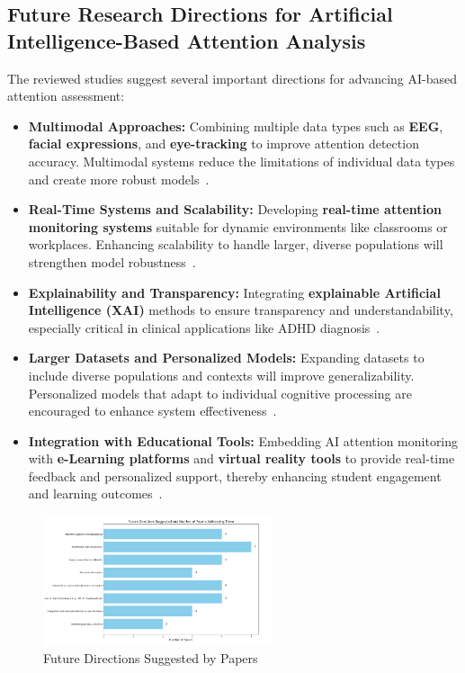 \documentclass[twocolumn,12pt]{article}
\begin{document}
{\subsection{Future Research Directions for Artificial Intelligence-Based Attention Analysis}

The reviewed studies suggest several important directions for advancing AI-based attention assessment:

\begin{itemize}
    \item \textbf{Multimodal Approaches:} Combining multiple data types such as \textbf{EEG}, \textbf{facial expressions}, and \textbf{eye-tracking} to improve attention detection accuracy. Multimodal systems reduce the limitations of individual data types and create more robust models~\citep{ref1,ref7,ref8}.
    
    \item \textbf{Real-Time Systems and Scalability:} Developing \textbf{real-time attention monitoring systems} suitable for dynamic environments like classrooms or workplaces. Enhancing scalability to handle larger, diverse populations will strengthen model robustness~\citep{ref6,ref16}.
    
    \item \textbf{Explainability and Transparency:} Integrating \textbf{explainable Artificial Intelligence (XAI)} methods to ensure transparency and understandability, especially critical in clinical applications like ADHD diagnosis~\citep{ref10,ref19}.
    
    \item \textbf{Larger Datasets and Personalized Models:} Expanding datasets to include diverse populations and contexts will improve generalizability. Personalized models that adapt to individual cognitive processing are encouraged to enhance system effectiveness~\citep{ref5,ref9}.
    
    \item \textbf{Integration with Educational Tools:} Embedding AI attention monitoring with \textbf{e-Learning platforms} and \textbf{virtual reality tools} to provide real-time feedback and personalized support, thereby enhancing student engagement and learning outcomes~\citep{ref7,ref8}.
\end{itemize}

\begin{figure}[H]
\centering
\includegraphics[width=0.6\textwidth]{bar.png}
\caption{Future Directions Suggested by Papers}
\end{figure}

}
\end{document}
